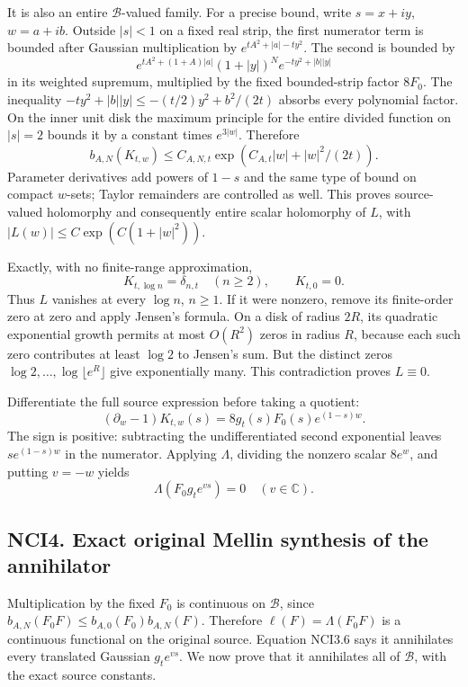 It is also an entire \(\mathcal B\)-valued family. For a precise bound,
write \(s=x+iy\), \(w=a+ib\). Outside \(|s|<1\) on a fixed real strip,
the first numerator term is bounded after Gaussian multiplication by
\(e^{tA^2+|a|-ty^2}\). The second is bounded by \[
e^{tA^2+(1+A)|a|}(1+|y|)^N e^{-ty^2+|b||y|}
\tag{NCI3.2}
\] in its weighted supremum, multiplied by the fixed bounded-strip
factor \(8F_0\). The inequality \(-ty^2+|b||y|\le-(t/2)y^2+b^2/(2t)\)
absorbs every polynomial factor. On the inner unit disk the maximum
principle for the entire divided function on \(|s|=2\) bounds it by a
constant times \(e^{3|w|}\). Therefore \[
b_{A,N}(K_{t,w})\le C_{A,N,t}\exp(C_{A,t}|w|+|w|^2/(2t)).
\tag{NCI3.3}
\] Parameter derivatives add powers of \(1-s\) and the same type of
bound on compact \(w\)-sets; Taylor remainders are controlled as well.
This proves source-valued holomorphy and consequently entire scalar
holomorphy of \(L\), with \(|L(w)|\le C\exp(C(1+|w|^2))\).

Exactly, with no finite-range approximation, \[
K_{t,\log n}=\delta_{n,t}\quad(n\ge2),\qquad K_{t,0}=0.
\tag{NCI3.4}
\] Thus \(L\) vanishes at every \(\log n\), \(n\ge1\). If it were
nonzero, remove its finite-order zero at zero and apply Jensen's
formula. On a disk of radius \(2R\), its quadratic exponential growth
permits at most \(O(R^2)\) zeros in radius \(R\), because each such zero
contributes at least \(\log2\) to Jensen's sum. But the distinct zeros
\(\log2,\ldots,\log\lfloor e^R\rfloor\) give exponentially many. This
contradiction proves \(L\equiv0\).

Differentiate the full source expression before taking a quotient: \[
(\partial_w-1)K_{t,w}(s)
=8g_t(s)F_0(s)e^{(1-s)w}.
\tag{NCI3.5}
\] The sign is positive: subtracting the undifferentiated second
exponential leaves \(s e^{(1-s)w}\) in the numerator. Applying
\(\Lambda\), dividing the nonzero scalar \(8e^w\), and putting \(v=-w\)
yields \[
\boxed{\Lambda(F_0g_t e^{vs})=0\quad(v\in\mathbb C).}
\tag{NCI3.6}
\]

\subsection{NCI4. Exact original Mellin synthesis of the
annihilator}\label{nci4.-exact-original-mellin-synthesis-of-the-annihilator}

Multiplication by the fixed \(F_0\) is continuous on \(\mathcal B\),
since \(b_{A,N}(F_0F)\le b_{A,0}(F_0)b_{A,N}(F)\). Therefore
\(\ell(F)=\Lambda(F_0F)\) is a continuous functional on the original
source. Equation NCI3.6 says it annihilates every translated Gaussian
\(g_t e^{vs}\). We now prove that it annihilates all of \(\mathcal B\),
with the exact source constants.

